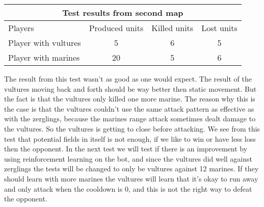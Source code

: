 \begin{centering}
 \begin{tabular}{|l|c|c|c|}
	\multicolumn{4}{c}{Test results from second map} \\
	\hline
	Players & Produced units & Killed units & Lost units\\
	\hline
	\hline
		Player with vultures & 5 & 6 & 5\\
	\hline
		Player with marines & 20 & 5 & 6\\
	\hline

\end{tabular}
\end{centering}


The result from this test wasn't as good as one would expect. The result of the vultures moving back and forth should be way better then static movement. But the fact is that the vultures only killed one more marine. The reason why this is the case is that the vultures couldn't use the same attack pattern as effective as with the zerglings, because the marines range attack sometimes dealt damage to the vultures. So the vultures is getting to close before attacking.
We see from this test that potential fields in itself is not enough, if we like to win or have less loss then the opponent. In the next test we will test if there is an improvement by using reinforcement learning on the bot, and since the vultures did well against zerglings the tests will be changed to only be vultures against 12 marines. If they should learn with more marines the vultures will learn that it's okay to run away and only attack when the cooldown is 0, and this is not the right way to defeat the opponent.





